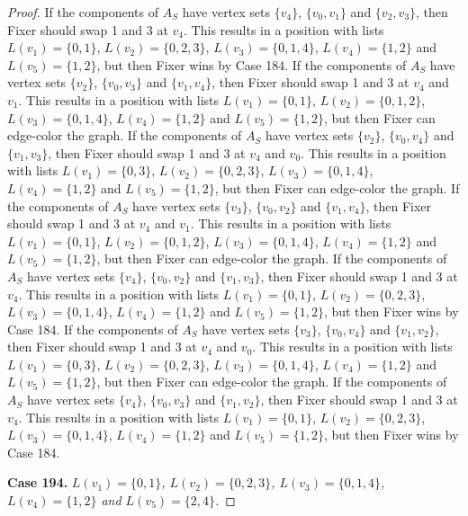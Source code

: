 \documentclass[12pt]{amsart}
\theoremstyle{plain}
\theoremstyle{definition}
\theoremstyle{remark}
\begin{document}
\begin{proof}
If the components of $A_S$ have vertex sets $\{v_4\}$, $\{v_0, v_1\}$ and $\{v_2, v_3\}$, then Fixer should swap 1 and 3 at $v_4$. This results in a position with lists $L(v_1) = \{0, 1\}$, $L(v_2) = \{0, 2, 3\}$, $L(v_3) = \{0, 1, 4\}$, $L(v_4) = \{1, 2\}$ and $L(v_5) = \{1, 2\}$, but then Fixer wins by Case 184.
If the components of $A_S$ have vertex sets $\{v_2\}$, $\{v_0, v_3\}$ and $\{v_1, v_4\}$, then Fixer should swap 1 and 3 at $v_4$ and $v_1$. This results in a position with lists $L(v_1) = \{0, 1\}$, $L(v_2) = \{0, 1, 2\}$, $L(v_3) = \{0, 1, 4\}$, $L(v_4) = \{1, 2\}$ and $L(v_5) = \{1, 2\}$, but then Fixer can edge-color the graph.
If the components of $A_S$ have vertex sets $\{v_2\}$, $\{v_0, v_4\}$ and $\{v_1, v_3\}$, then Fixer should swap 1 and 3 at $v_4$ and $v_0$. This results in a position with lists $L(v_1) = \{0, 3\}$, $L(v_2) = \{0, 2, 3\}$, $L(v_3) = \{0, 1, 4\}$, $L(v_4) = \{1, 2\}$ and $L(v_5) = \{1, 2\}$, but then Fixer can edge-color the graph.
If the components of $A_S$ have vertex sets $\{v_3\}$, $\{v_0, v_2\}$ and $\{v_1, v_4\}$, then Fixer should swap 1 and 3 at $v_4$ and $v_1$. This results in a position with lists $L(v_1) = \{0, 1\}$, $L(v_2) = \{0, 1, 2\}$, $L(v_3) = \{0, 1, 4\}$, $L(v_4) = \{1, 2\}$ and $L(v_5) = \{1, 2\}$, but then Fixer can edge-color the graph.
If the components of $A_S$ have vertex sets $\{v_4\}$, $\{v_0, v_2\}$ and $\{v_1, v_3\}$, then Fixer should swap 1 and 3 at $v_4$. This results in a position with lists $L(v_1) = \{0, 1\}$, $L(v_2) = \{0, 2, 3\}$, $L(v_3) = \{0, 1, 4\}$, $L(v_4) = \{1, 2\}$ and $L(v_5) = \{1, 2\}$, but then Fixer wins by Case 184.
If the components of $A_S$ have vertex sets $\{v_3\}$, $\{v_0, v_4\}$ and $\{v_1, v_2\}$, then Fixer should swap 1 and 3 at $v_4$ and $v_0$. This results in a position with lists $L(v_1) = \{0, 3\}$, $L(v_2) = \{0, 2, 3\}$, $L(v_3) = \{0, 1, 4\}$, $L(v_4) = \{1, 2\}$ and $L(v_5) = \{1, 2\}$, but then Fixer can edge-color the graph.
If the components of $A_S$ have vertex sets $\{v_4\}$, $\{v_0, v_3\}$ and $\{v_1, v_2\}$, then Fixer should swap 1 and 3 at $v_4$. This results in a position with lists $L(v_1) = \{0, 1\}$, $L(v_2) = \{0, 2, 3\}$, $L(v_3) = \{0, 1, 4\}$, $L(v_4) = \{1, 2\}$ and $L(v_5) = \{1, 2\}$, but then Fixer wins by Case 184.

\noindent\textbf{Case 194.  }\textit{$L(v_1) = \{0, 1\}$, $L(v_2) = \{0, 2, 3\}$, $L(v_3) = \{0, 1, 4\}$, $L(v_4) = \{1, 2\}$ and $L(v_5) = \{2, 4\}$.}


\end{proof}
\end{document}
